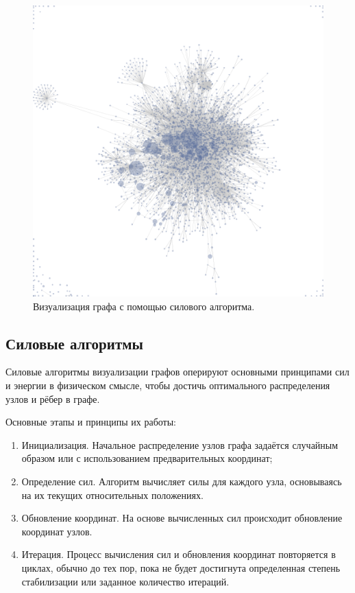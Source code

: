 \documentclass[14pt, russian]{scrartcl}
\begin{document}
\begin{figure}[H]
	\centering
	\begin{minipage}[t]{.8\textwidth}
		\centering
		\includegraphics[width=.7\textwidth]{./imgs/force-directed-example.png}
	\end{minipage}
	\caption{Визуализация графа с помощью силового алгоритма.}
	\label{fig:force_directed_example}
\end{figure}

\subsection{Силовые алгоритмы}

Силовые алгоритмы визуализации графов оперируют основными принципами сил и энергии в физическом смысле, чтобы достичь оптимального распределения узлов и рёбер в графе.

Основные этапы и принципы их работы:

\begin{enumerate}
	\item Инициализация. Начальное распределение узлов графа задаётся случайным образом или с использованием предварительных координат;
	\item Определение сил. Алгоритм вычисляет силы для каждого узла, основываясь на их текущих относительных положениях.
	\item Обновление координат. На основе вычисленных сил происходит обновление координат узлов.
	\item Итерация. Процесс вычисления сил и обновления координат повторяется в циклах, обычно до тех пор, пока не будет достигнута определенная степень стабилизации или заданное количество итераций.
\end{enumerate}
\end{document}
